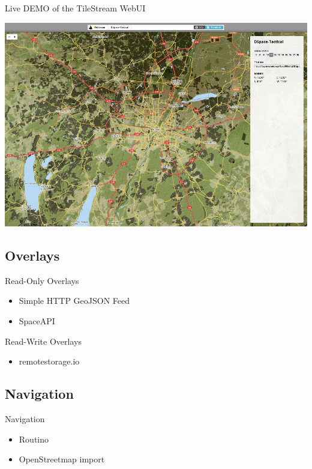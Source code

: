 \documentclass{beamer}
\begin{document}
\begin{frame}{Live DEMO of the TileStream WebUI}
 \begin{center}
  \includegraphics[scale=0.3]{tilestream_ui}
 \end{center}
\end{frame}

\subsection{Overlays}

\begin{frame}{Read-Only Overlays}
 \begin{itemize}
  \item Simple HTTP GeoJSON Feed
  \item SpaceAPI
 \end{itemize}
\end{frame}


\begin{frame}{Read-Write Overlays}
 \begin{itemize}
  \item remotestorage.io
 \end{itemize}
\end{frame}


\subsection{Navigation}

\begin{frame}{Navigation}
 \begin{itemize}
  \item Routino
  \item OpenStreetmap import
 \end{itemize}
\end{frame}
\end{document}

